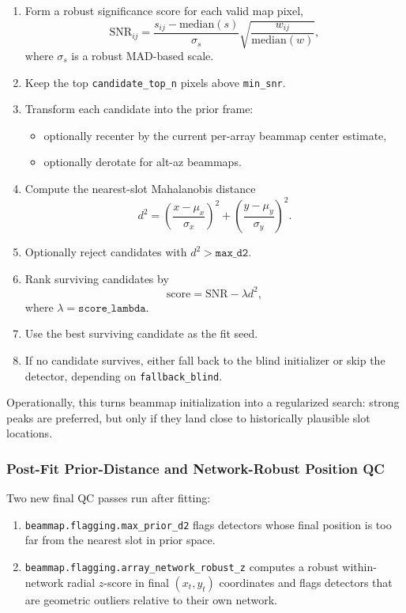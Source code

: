 \documentclass[11pt]{article}
\begin{document}
\begin{enumerate}[leftmargin=1.5em]
\item Form a robust significance score for each valid map pixel,
\[
\mathrm{SNR}_{ij} =
\frac{s_{ij} - \mathrm{median}(s)}{\sigma_s}
\sqrt{\frac{w_{ij}}{\mathrm{median}(w)}},
\]
where \(\sigma_s\) is a robust MAD-based scale.
\item Keep the top \texttt{candidate\_top\_n} pixels above
\texttt{min\_snr}.
\item Transform each candidate into the prior frame:
\begin{itemize}[leftmargin=1.5em]
\item optionally recenter by the current per-array beammap center estimate,
\item optionally derotate for alt-az beammaps.
\end{itemize}
\item Compute the nearest-slot Mahalanobis distance
\[
d^2 =
\left(\frac{x-\mu_x}{\sigma_x}\right)^2 +
\left(\frac{y-\mu_y}{\sigma_y}\right)^2.
\]
\item Optionally reject candidates with \(d^2 > \texttt{max\_d2}\).
\item Rank surviving candidates by
\[
\mathrm{score} = \mathrm{SNR} - \lambda d^2,
\]
where \(\lambda = \texttt{score\_lambda}\).
\item Use the best surviving candidate as the fit seed.
\item If no candidate survives, either fall back to the blind initializer or
skip the detector, depending on \texttt{fallback\_blind}.
\end{enumerate}

Operationally, this turns beammap initialization into a regularized search:
strong peaks are preferred, but only if they land close to historically
plausible slot locations.

\subsubsection{Post-Fit Prior-Distance and Network-Robust Position QC}

Two new final QC passes run after fitting:

\begin{enumerate}[leftmargin=1.5em]
\item \texttt{beammap.flagging.max\_prior\_d2} flags detectors whose final
position is too far from the nearest slot in prior space.
\item \texttt{beammap.flagging.array\_network\_robust\_z} computes a robust
within-network radial \(z\)-score in final \((x_t,y_t)\) coordinates and flags
detectors that are geometric outliers relative to their own network.
\end{enumerate}
\end{document}
